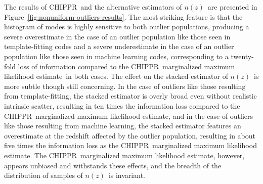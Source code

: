 \documentclass[iop]{emulateapj}
\newcommand{\Fig}[1]{Figure~\ref{#1}}
\newcommand{\project}[1]{\textsc{#1}}
\newcommand{\Chippr}{\project{CHIPPR}}%
\newcommand{\nz}{$n(z)$}
\newcommand{\mmle}{marginalized maximum likelihood estimate}%
\begin{document}
The results of \Chippr\ and the alternative estimators of \nz\ are presented in \Fig{fig:nonuniform-outliers-results}.
The most striking feature is that the histogram of modes is highly sensitive to both outlier populations, producing a severe overestimate in the case of an outlier population like those seen in template-fitting codes and a severe underestimate in the case of an outlier population like those seen in machine learning codes, corresponding to a twenty-fold loss of information compared to the \Chippr\ \mmle\ in both cases.
The effect on the stacked estimator of \nz\ is more subtle though still concerning.
In the case of outliers like those resulting from template-fitting, the stacked estimator is overly broad even without realistic intrinsic scatter, resulting in ten times the information loss compared to the \Chippr\ \mmle, and in the case of outliers like those resulting from machine learning, the stacked estimator features an overestimate at the redshift affected by the outlier population, resulting in about five times the information loss as the \Chippr\ \mmle.
The \Chippr\ \mmle, however, appears unbiased and withstands these effects, and the breadth of the distribution of samples of \nz\ is invariant.
\end{document}
